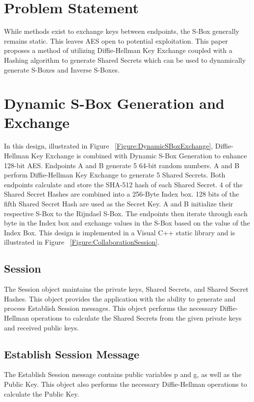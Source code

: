 \documentclass[journal]{IEEEtran}
\begin{document}
\section{Problem Statement}
While methods exist to exchange keys between endpoints, the S-Box generally remains static. This leaves AES
open to potential exploitation. This paper proposes a method of utilizing Diffie-Hellman Key Exchange coupled
with a Hashing algorithm to generate Shared Secrets which can be used to dynamically generate S-Boxes and 
Inverse S-Boxes.

\section{Dynamic S-Box Generation and Exchange}
In this design, illustrated in Figure ~\ref{Figure:DynamicSBoxExchange}, Diffie-Hellman Key Exchange is combined
with Dynamic S-Box Generation to enhance 128-bit AES. Endpoints A and B generate 5 64-bit random numbers. 
A and B perform Diffie-Hellman Key Exchange to generate 5 Shared Secrets. Both endpoints calculate and 
store the SHA-512 hash of each Shared Secret. 4 of the Shared Secret Hashes are combined into a 256-Byte 
Index box. 128 bits of the fifth Shared Secret Hash are used as the Secret Key. A and B initialize their
respective S-Box to the Rijndael S-Box. The endpoints then iterate through each byte in the Index box and
exchange values in the S-Box based on the value of the Index Box. This design is implemented in a 
Visual C++ static library and is illustrated in Figure ~\ref{Figure:CollaborationSession}.

\subsection{Session}
The Session object maintains the private keys, Shared Secrets, and Shared Secret Hashes. This object provides the application with the ability to generate and process Establish Session messages. This object performs the necessary Diffie-Hellman operations to calculate the Shared Secrets from the given private keys and received public keys. 

\subsection{Establish Session Message}
The Establish Session message contains public variables p and g, as well as the Public Key. This object also performs the necessary Diffie-Hellman operations to calculate the Public Key.
\end{document}
